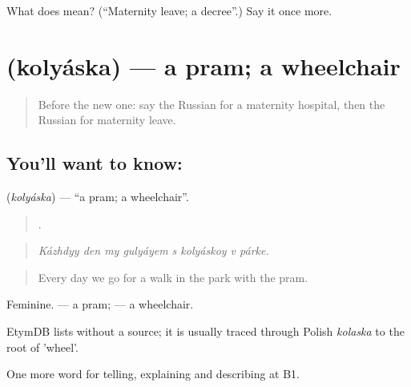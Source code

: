 \begin{tcolorbox}[breakable,colback=teal!4,colframe=teal!35!black,title={Before you move on}]
What does  mean? (\textquotedblleft{}Maternity leave; a decree\textquotedblright{}.) Say it once more.
\end{tcolorbox}
\section[\texorpdfstring{\ru{коляска} (kolyáska)}{коляска (kolyáska)}]{ (kolyáska) — a pram; a wheelchair}

\label{lesson:RU-C495-kolyaska}



\begin{quote}
Before the new one: say the Russian for a maternity hospital, then the Russian for maternity leave.
\end{quote}

\subsection*{You'll want to know: }
\textbf{} (\emph{kolyáska}) — \textquotedblleft{}a pram; a wheelchair\textquotedblright{}.

\begin{quote}
       .
\end{quote}

\begin{quote}
\emph{Kázhdyy den my gulyáyem s kolyáskoy v párke.}
\end{quote}

\begin{quote}
Every day we go for a walk in the park with the pram.
\end{quote}

Feminine. \emph{ } — a pram; \emph{ } — a wheelchair.

\begin{cousinweb}
EtymDB lists \emph{} without a source; it is usually traced through Polish \emph{kolaska} to the root of \emph{} 'wheel'.
\end{cousinweb}

\begin{grammarlens}[title={What you've built}]
One more word for telling, explaining and describing at B1.
\end{grammarlens}

